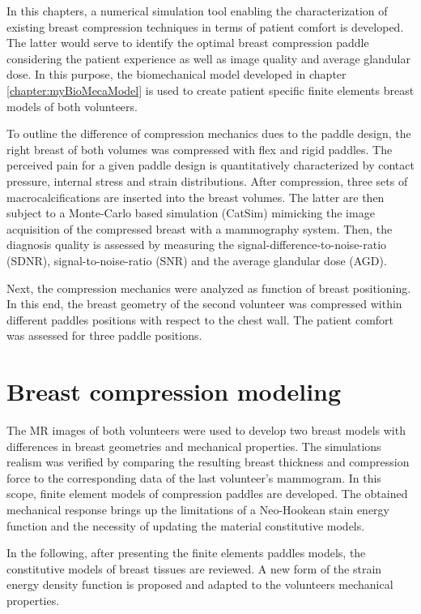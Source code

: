 
In this chapters, a numerical simulation tool enabling the characterization of existing breast compression techniques in terms of patient comfort is developed. The latter would serve to identify the optimal breast compression paddle considering the patient experience as well as image quality and average glandular dose. In this purpose, the biomechanical model developed in chapter \ref{chapter:myBioMecaModel} is used to create patient specific finite elements breast models of both volunteers. 

To outline the difference of compression mechanics dues to the paddle design, the right breast of both volumes was compressed with flex and rigid paddles. The perceived pain for a given paddle design is quantitatively characterized by contact pressure, internal stress and strain distributions. After compression, three sets of macrocalcifications are inserted into the breast volumes. The latter are then subject to a Monte-Carlo based simulation (CatSim) mimicking the image acquisition of the compressed breast with a mammography system. Then, the diagnosis quality is assessed by measuring the signal-difference-to-noise-ratio (SDNR), signal-to-noise-ratio (SNR) and the average glandular dose (AGD).


Next, the compression mechanics were analyzed as function of breast positioning. In this end, the breast geometry of the second volunteer was compressed within different paddles positions with respect to the chest wall. The patient comfort was assessed for three paddle positions. 

 

\clearpage


\section{Breast compression modeling}
The MR images of both volunteers were used to develop two breast models with differences in breast geometries and mechanical properties. The simulations realism was verified by comparing the resulting breast thickness and compression force to the corresponding data of the last volunteer's mammogram.  In this scope, finite element models of compression paddles are developed. The obtained mechanical response brings up the limitations of a Neo-Hookean stain energy function and the necessity of updating the material constitutive models. 

In the following, after presenting the finite elements paddles models, the constitutive models of breast tissues are reviewed. A new form of the strain energy density function is proposed and adapted to the volunteers mechanical properties.   

